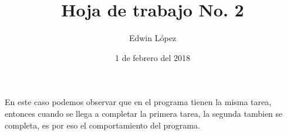 \documentclass{article}
\author{Edwin L\'opez}
\title {\textbf{Hoja de trabajo No. 2}}
\date {1 de febrero del 2018}
\begin{document}
\maketitle
En este caso podemos observar que en el programa tienen la misma tarea, entonces cuando se llega a completar la primera tarea, la segunda tambien se completa, es por eso el comportamiento del programa.
\end{document}
